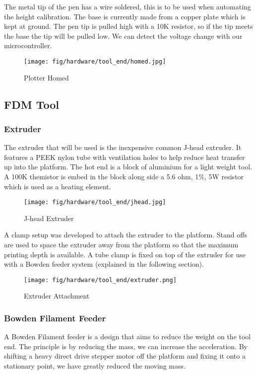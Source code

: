 \documentclass[a4paper, 11pt, twoside]{Thesis}  %
\begin{document}
The metal tip of the pen has a wire soldered, this is to be used when automating the height calibration. The base is currently made from a copper plate which is kept at ground. The pen tip is pulled high with a 10K resistor, so if the tip meets the base the tip will be pulled low. We can detect the voltage change with our microcontroller. 

\begin{figure}[H]
\centering%
\texttt{[image: fig/hardware/tool\_end/homed.jpg]}
\caption{Plotter Homed}
\label{fig:homed.jpg}
\end{figure}\subsection{FDM Tool}

\subsubsection{Extruder}

The extruder that will be used is the inexpensive common J-head extruder. It features a PEEK nylon tube with ventilation holes to help reduce heat transfer up into the platform. The hot end is a block of aluminium for a light weight tool. A 100K themistor is embed in the block along side a 5.6 ohm, 1\%, 5W resistor which is used as a heating element.

\begin{figure}[H]
\centering%
\texttt{[image: fig/hardware/tool\_end/jhead.jpg]}
\caption{J-head Extruder}
\label{fig:jhead.jpg}
\end{figure}
A clamp setup was developed to attach the extruder to the platform. Stand offs are used to space the extruder away from the platform so that the maximum printing depth is available. A tube clamp is fixed on top of the extruder for use with a Bowden feeder system (explained in the following section).

\begin{figure}[H]
\centering%
\texttt{[image: fig/hardware/tool\_end/extruder.png]}
\caption{Extruder Attachment}
\label{fig:extruder.png}
\end{figure}

\subsubsection{Bowden Filament Feeder}

A Bowden Filament feeder is a design that aims to reduce the weight on the tool end. The principle is by reducing the mass, we can increase the acceleration. By shifting a heavy direct drive stepper motor off the platform and fixing it onto a stationary point, we have greatly reduced the moving mass.
\end{document}
